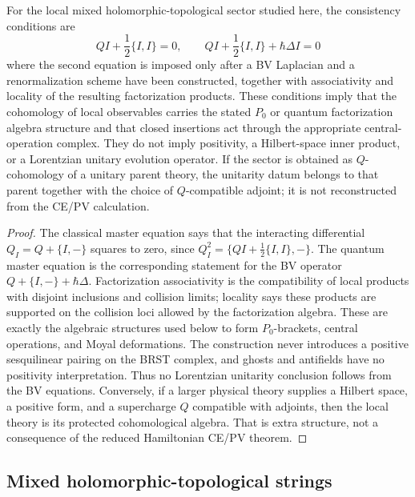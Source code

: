 \documentclass[11pt]{memoir}
\begin{document}
\begin{thm}
  \label{thm:bv-replacement-unitarity}
  For the local mixed holomorphic-topological sector studied here, the
  consistency conditions are
  \[
    QI+\frac12\{I,I\}=0,\qquad
    QI+\frac12\{I,I\}+\hbar\Delta I=0
  \]
  where the second equation is imposed only after a BV Laplacian and a
  renormalization scheme have been constructed, together with
  associativity and locality of the resulting factorization products.
  These conditions imply that the cohomology of local observables carries
  the stated \(P_0\) or quantum factorization algebra structure and that
  closed insertions act through the appropriate central-operation complex.
  They do not imply positivity, a Hilbert-space inner product, or a
  Lorentzian unitary evolution operator. If the sector is obtained as
  \(Q\)-cohomology of a unitary parent theory, the unitarity datum belongs
  to that parent together with the choice of \(Q\)-compatible adjoint; it
  is not reconstructed from the CE/PV calculation.
\end{thm}

\begin{proof}
  The classical master equation says that the interacting differential
  \(Q_I=Q+\{I,-\}\) squares to zero, since
  \(Q_I^2=\{QI+\frac12\{I,I\},-\}\).  The quantum master equation is the
  corresponding statement for the BV operator
  \(Q+\{I,-\}+\hbar\Delta\).  Factorization associativity is the
  compatibility of local products with disjoint inclusions and collision
  limits; locality says these products are supported on the collision
  loci allowed by the factorization algebra. These are exactly the
  algebraic structures used below to form \(P_0\)-brackets, central
  operations, and Moyal deformations. The construction never introduces a
  positive sesquilinear pairing on the BRST complex, and ghosts and
  antifields have no positivity interpretation. Thus no Lorentzian
  unitarity conclusion follows from the BV equations. Conversely, if a
  larger physical theory supplies a Hilbert space, a positive form, and a
  supercharge \(Q\) compatible with adjoints, then the local theory is its
  protected cohomological algebra. That is extra structure, not a
  consequence of the reduced Hamiltonian CE/PV theorem.
\end{proof}

\subsection{Mixed holomorphic-topological strings}
\end{document}
